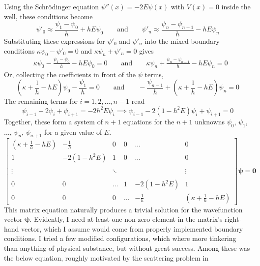 \documentclass[11pt, a4paper]{article}
\newcommand{\eqtext}[1]{\qquad \text{#1} \qquad}
\newcommand{\schro}{Schr\"{o}dinger\xspace}
\begin{document}
Using the \schro equation $ \psi''(x) = -2E\psi(x) $ with $ V(x) = 0 $ inside the well, these conditions become
\begin{equation*}
	\psi'_0 \approx \frac{\psi_{1} - \psi_{0}}{h} + hE\psi_0 \eqtext{and} \psi'_{n} \approx \frac{\psi_{n} - \psi_{n-1}}{h} -hE\psi_{n}
\end{equation*}
Substituting these expressions for $ \psi'_0 $ and $ \psi'_{n} $ into the mixed boundary conditions $ \kappa \psi_0 - \psi'_0 = 0 $ and $ \kappa \psi_{n} + \psi'_{n} = 0 $ gives
\begin{align*}
	&\kappa \psi_{0} - \frac{\psi_{1} - \psi_{0}}{h} - hE\psi_{0} = 0 \eqtext{and} \kappa \psi_{n} + \frac{\psi_{n} - \psi_{n-1}}{h} -hE\psi_{n} = 0
\end{align*}
Or, collecting the coefficients in front of the $ \psi $ terms,
\begin{equation*}
	\left(\kappa + \frac{1}{h} - hE\right)\psi_{0} - \frac{\psi_{1}}{h} = 0 \eqtext{and} -\frac{\psi_{n-1}}{h} + \left(\kappa + \frac{1}{h} - hE\right)\psi_{n} = 0
\end{equation*}
The remaining terms for $ i = 1, 2, \ldots, n-1 $ read
\begin{equation*}
	\psi_{i-1} - 2\psi_{i} + \psi_{i+1} = -2h^{2}E\psi_{i} \implies \psi_{i-1} - 2(1 - h^{2}E)\psi_{i} + \psi_{i+1} = 0
\end{equation*}
Together, these form a system of $ n + 1 $ equations for the $ n + 1 $ unknowns $ \psi_{0}$, $\psi_{1}$, $\ldots$, $ \psi_{n}$, $ \psi_{n+1} $ for a given value of $ E $.
\begin{equation*}
\begin{bmatrix}
	\left(\kappa + \frac{1}{h} - hE\right) & -\frac{1}{h} & 0 & 0 & \ldots  & 0\\
	1 & - 2(1 - h^{2}E) & 1 & 0 & \ldots & 0\\
	& & & & &\\
	\vdots & & \ddots & & & \vdots \\
	& & & & &\\
	0 & 0 & \ldots & 1 & - 2(1 - h^{2}E) & 1\\
	0 & 0 & 0 & \ldots & -\frac{1}{h} & \left(\kappa + \frac{1}{h} - hE\right)
\end{bmatrix}
\bm{\psi}
= 
\bm{0}
\end{equation*}
This matrix equation naturally produces a trivial solution for the wavefunction vector $ \bm{\psi} $. Evidently, I need at least one non-zero element in the matrix's right-hand vector, which I assume would come from properly implemented boundary conditions. I tried a few modified configurations, which where more tinkering than anything of physical substance, but without great success. Among these was the below equation, roughly motivated by the scattering problem in \cite{king}
\end{document}
